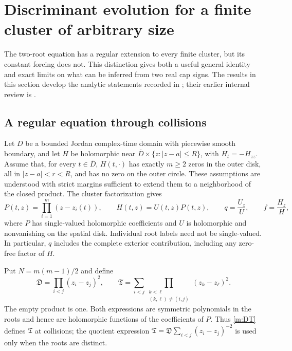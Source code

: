 \section{Discriminant evolution for a finite cluster of arbitrary size}
\label{m:section}

The two-root equation has a regular extension to every finite cluster,
but its constant forcing does not.  This distinction gives both a useful
general identity and exact limits on what can be inferred from two real
cap signs.  The results in this section develop the analytic statements
recorded in \cite{note09}; their earlier internal review is \cite{review08}.

\subsection{A regular equation through collisions}

Let $D$ be a bounded Jordan complex-time domain with piecewise smooth
boundary, and let $H$
be holomorphic near
$\overline D\times\{z:|z-a|\leq R\}$, with $H_t=-H_{zz}$.
Assume that, for every $t\in\overline D$, $H(t,\cdot)$ has exactly
$m\geq2$ zeros in the outer disk, all in $|z-a|<r<R$, and has no zero
on the outer circle.  These assumptions are understood with strict
margins sufficient to extend them to a neighborhood of the closed
product.  The cluster factorization gives
\begin{equation}\label{m:factor}
 P(t,z)=\prod_{i=1}^m(z-z_i(t)),\qquad H(t,z)=U(t,z)P(t,z),
 \qquad q=\frac{U_z}{U},\qquad f=\frac{H_z}{H},
\end{equation}
where $P$ has single-valued holomorphic coefficients and $U$ is
holomorphic and nonvanishing on the spatial disk.  Individual root
labels need not be single-valued.  In particular, $q$ includes the
complete exterior contribution, including any zero-free factor of $H$.

Put $N=m(m-1)/2$ and define
\begin{equation}\label{m:DT}
 \mathfrak D=\prod_{i<j}(z_i-z_j)^2,\qquad
 \mathfrak T=\sum_{i<j}
       \prod_{\substack{k<\ell\\(k,\ell)\ne(i,j)}}
                         (z_k-z_\ell)^2.
\end{equation}
The empty product is one.  Both expressions are symmetric polynomials
in the roots and hence are holomorphic functions of the coefficients
of $P$.  Thus \eqref{m:DT} defines $\mathfrak T$ at collisions; the
quotient expression
$\mathfrak T=\mathfrak D\sum_{i<j}(z_i-z_j)^{-2}$ is used only when
the roots are distinct.


